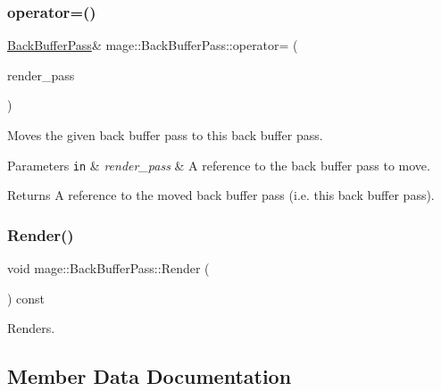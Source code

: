 \subsubsection{\texorpdfstring{operator=()}{operator=()}\hspace{0.1cm}{\footnotesize\ttfamily [2/2]}}
{\footnotesize\ttfamily \hyperlink{classmage_1_1_back_buffer_pass}{Back\+Buffer\+Pass}\& mage\+::\+Back\+Buffer\+Pass\+::operator= (\begin{DoxyParamCaption}\item[{\hyperlink{classmage_1_1_back_buffer_pass}{Back\+Buffer\+Pass} \&\&}]{render\+\_\+pass }\end{DoxyParamCaption})\hspace{0.3cm}{\ttfamily [delete]}}

Moves the given back buffer pass to this back buffer pass.


\begin{DoxyParams}[1]{Parameters}
\mbox{\tt in}  & {\em render\+\_\+pass} & A reference to the back buffer pass to move. \\
\hline
\end{DoxyParams}
\begin{DoxyReturn}{Returns}
A reference to the moved back buffer pass (i.\+e. this back buffer pass). 
\end{DoxyReturn}
\hypertarget{classmage_1_1_back_buffer_pass_a6f0265c182a4b1ac2badd5df3fb11545}{}\label{classmage_1_1_back_buffer_pass_a6f0265c182a4b1ac2badd5df3fb11545} 
\subsubsection{\texorpdfstring{Render()}{Render()}}
{\footnotesize\ttfamily void mage\+::\+Back\+Buffer\+Pass\+::\+Render (\begin{DoxyParamCaption}{ }\end{DoxyParamCaption}) const\hspace{0.3cm}{\ttfamily [noexcept]}}

Renders. 

\subsection{Member Data Documentation}
\hypertarget{classmage_1_1_back_buffer_pass_a08d816be20d35edae0b8fc7975bde76d}{}\label{classmage_1_1_back_buffer_pass_a08d816be20d35edae0b8fc7975bde76d} 
